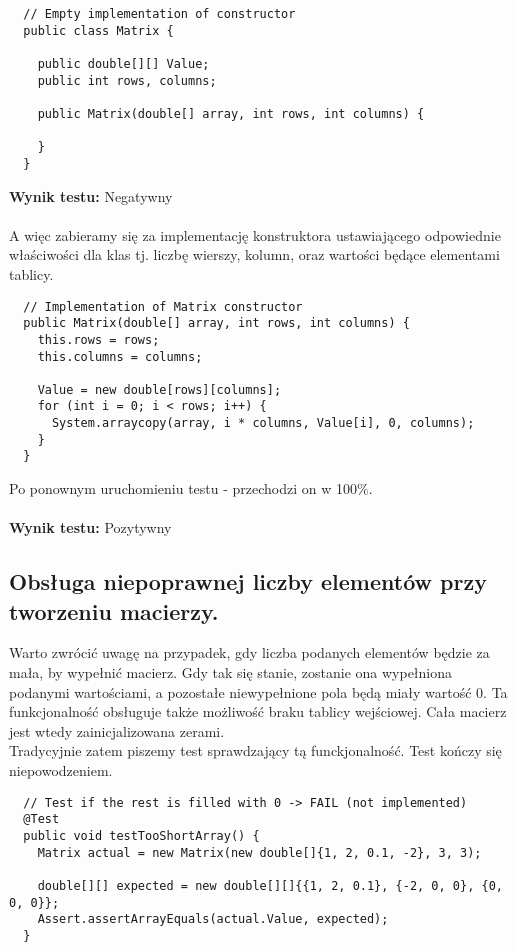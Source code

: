\documentclass[a4paper,12pt,twoside]{article}
\begin{document}
\begin{lstlisting}
  // Empty implementation of constructor
  public class Matrix {

    public double[][] Value;
    public int rows, columns;

    public Matrix(double[] array, int rows, int columns) {

    }
  }
\end{lstlisting}
\medskip

\noindent
\textbf{Wynik testu: }{\color{red} Negatywny}\\\\
A więc zabieramy się za implementację konstruktora ustawiającego odpowiednie właściwości dla klas tj.
liczbę wierszy, kolumn, oraz wartości będące elementami tablicy.\\

\begin{lstlisting}
  // Implementation of Matrix constructor
  public Matrix(double[] array, int rows, int columns) {
    this.rows = rows;
    this.columns = columns;

    Value = new double[rows][columns];
    for (int i = 0; i < rows; i++) {
      System.arraycopy(array, i * columns, Value[i], 0, columns);
    }
  }
\end{lstlisting}
\medskip

\noindent
Po ponownym uruchomieniu testu - przechodzi on w 100\%.\\\\
\textbf{Wynik testu: }{\color{green} Pozytywny}


\subsection{Obsługa niepoprawnej liczby elementów przy tworzeniu macierzy.}
\bigskip

Warto zwrócić uwagę na przypadek, gdy liczba podanych elementów będzie za mała, by wypełnić macierz.
Gdy tak się stanie, zostanie ona wypełniona podanymi wartościami, a pozostałe niewypełnione pola będą miały wartość 0.
Ta funkcjonalność obsługuje także możliwość braku tablicy wejściowej. Cała macierz jest wtedy zainicjalizowana
zerami.\\

\noindent
Tradycyjnie zatem piszemy test sprawdzający tą funckjonalność. Test kończy się niepowodzeniem.\\

\begin{lstlisting}
  // Test if the rest is filled with 0 -> FAIL (not implemented)
  @Test
  public void testTooShortArray() {
    Matrix actual = new Matrix(new double[]{1, 2, 0.1, -2}, 3, 3);

    double[][] expected = new double[][]{{1, 2, 0.1}, {-2, 0, 0}, {0, 0, 0}};
    Assert.assertArrayEquals(actual.Value, expected);
  }
\end{lstlisting}
\medskip
\end{document}
